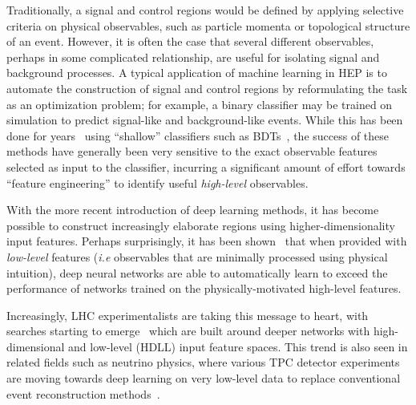 \documentclass[reprint,nofootinbib,...]{revtex4-1}
\begin{document}
Traditionally, a signal and control regions would be defined by applying selective criteria on physical observables, such as particle momenta or topological structure of an event.
However, it is often the case that several different observables, perhaps in some complicated relationship, are useful for isolating signal and background processes.
A typical application of machine learning in HEP is to automate the construction of signal and control regions by reformulating the task as an optimization problem; for example, a binary classifier may be trained on simulation to predict signal-like and background-like events.
While this has been done for years~\cite{} using ``shallow'' classifiers such as BDTs~\cite{}, the success of these methods have generally been very sensitive to the exact observable features selected as input to the classifier, incurring a significant amount of effort towards ``feature engineering'' to identify useful \textit{high-level} observables.

With the more recent introduction of deep learning methods, it has become possible to construct increasingly elaborate regions using higher-dimensionality input features.
Perhaps surprisingly, it has been shown~\cite{Baldi:2014kfa,deOliveira:2015xxd,Baldi:2016fql,Guest:2016iqz} that when provided with \textit{low-level} features (\textit{i.e} observables that are minimally processed using physical intuition), deep neural networks are able to automatically learn to exceed the performance of networks trained on the physically-motivated high-level features.


Increasingly, LHC experimentalists are taking this message to heart, with searches starting to emerge~\cite{Andrews:2018nwy,Andrews:2019faz,more??} which are built around deeper networks with high-dimensional and low-level (HDLL) input feature spaces.
This trend is also seen in related fields such as neutrino physics, where various TPC detector experiments are moving towards deep learning on very low-level data to replace conventional event reconstruction methods~\cite{Acciarri:2016ryt,Delaquis:2018zqi}.
\end{document}
